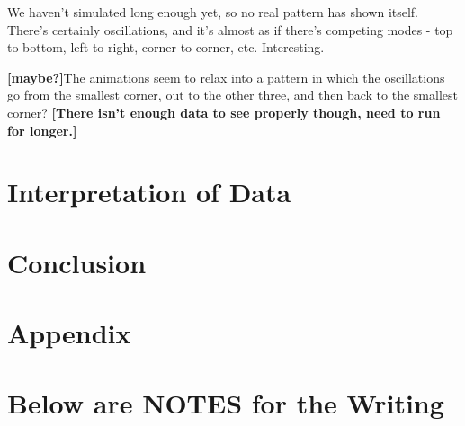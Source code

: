 \documentclass[letterpaper,twocolumn,amsmath,amssymb,pre]{revtex4-1}
\newcommand{\red}[1]{{\bf \color{red} #1}}
\newcommand{\fixme}[1]{\red{[#1]}}
\begin{document}
We haven't simulated long enough yet, so no real pattern has shown
itself.  There's certainly oscillations, and it's almost as if there's
competing modes - top to bottom, left to right, corner to corner, etc.
Interesting.

\fixme{maybe?}The animations seem to relax into a pattern in which the oscillations
go from the smallest corner, out to the other three, and then back to
the smallest corner?  \fixme{There isn't enough data to see properly
  though, need to run for longer.}


\section{Interpretation of Data}
\section{Conclusion}
\section*{Appendix}







\section{Below are NOTES for the Writing}
\end{document}
